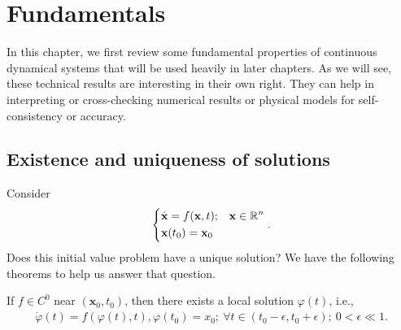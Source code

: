 \chapter{Fundamentals}
 In this chapter, we first review some fundamental properties of continuous dynamical systems that will be used heavily in later chapters. As we will see, these technical results are interesting in their own right. They can help in interpreting or cross-checking numerical results or physical models for self-consistency or accuracy.
\section{Existence and uniqueness of solutions}
Consider  
\begin{align}
\begin{dcases}
	\dot{ \textbf{x}} = f( \textbf{x},t); &  \textbf{x} \in \mathbb{R}^{n} \\
	 \textbf{x}(t_0) =  \textbf{x}_0
\end{dcases}.
\end{align}
Does this initial value problem have a unique solution? We have the following theorems to help us answer that question.
\begin{theorem}[Peano]
	\label{thm:Peano}
	If $f\in C^0$ near $( \textbf{x}_0, t_0)$, then there exists a local solution $\varphi(t)$, i.e., 
\begin{align}
	\dot{\varphi}(t) = f(\varphi(t), t), \varphi(t_0) = x_0;\ \forall  t\in (t_0 - \epsilon, t_0 + \epsilon);\ 0<  \epsilon \ll 1.
\end{align}
\end{theorem}
